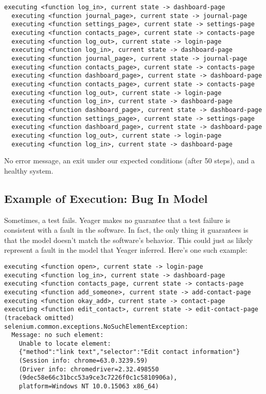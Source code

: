 \begin{Verbatim}[fontsize=\small]
  executing <function log_in>, current state -> dashboard-page
  executing <function journal_page>, current state -> journal-page
  executing <function settings_page>, current state -> settings-page
  executing <function contacts_page>, current state -> contacts-page
  executing <function log_out>, current state -> login-page
  executing <function log_in>, current state -> dashboard-page
  executing <function journal_page>, current state -> journal-page
  executing <function contacts_page>, current state -> contacts-page
  executing <function dashboard_page>, current state -> dashboard-page
  executing <function contacts_page>, current state -> contacts-page
  executing <function log_out>, current state -> login-page
  executing <function log_in>, current state -> dashboard-page
  executing <function dashboard_page>, current state -> dashboard-page
  executing <function settings_page>, current state -> settings-page
  executing <function dashboard_page>, current state -> dashboard-page
  executing <function log_out>, current state -> login-page
  executing <function log_in>, current state -> dashboard-page
\end{Verbatim}

No error message, an exit under our expected conditions (after 50 steps), and a healthy system.

\subsection{Example of Execution: Bug In Model}
Sometimes, a test fails. Yeager makes no guarantee that a test failure is consistent with a fault in the software. In fact, the only thing it guarantees is that the model doesn't match the software's behavior. This could just as likely represent a fault in the model that Yeager inferred. Here's one such example:

\begin{Verbatim}[fontsize=\small]
executing <function open>, current state -> login-page
executing <function log_in>, current state -> dashboard-page
executing <function contacts_page, current state -> contacts-page
executing <function add_someone>, current state -> add-contact-page
executing <function okay_add>, current state -> contact-page
executing <function edit_contact>, current state -> edit-contact-page
(traceback omitted)
selenium.common.exceptions.NoSuchElementException:
  Message: no such element:
    Unable to locate element:
    {"method":"link text","selector":"Edit contact information"}
    (Session info: chrome=63.0.3239.59)
    (Driver info: chromedriver=2.32.498550
    (9dec58e66c31bcc53a9ce3c7226f0c1c5810906a),
    platform=Windows NT 10.0.15063 x86_64)
\end{Verbatim}

